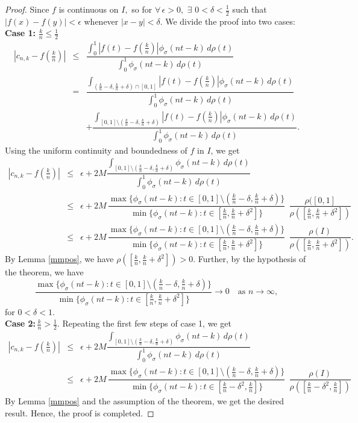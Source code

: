 \documentclass[12pt, reqno]{amsart}
\numberwithin{equation}{section}
\theoremstyle{definition}
\theoremstyle{remark}
\numberwithin{equation}{section}
\begin{document}
\begin{proof}
Since $f$ is continuous on $I,$ so for $\forall\,\epsilon>0,$ $\exists \,\, 0<\delta<\frac{1}{2}$ such that $|f(x)-f(y)|<\epsilon$ whenever $|x-y|<\delta$. We divide the proof into two cases: \\
\textbf{Case 1:} $\frac{k}{n}\leq\frac{1}{2}$
\begin{eqnarray*}
\left|c_{n,k}-f\left(\frac{k}n{}\right)\right|
&\leq&\dfrac{\displaystyle\int_{0}^{1}\left|f(t)-f\left(\frac{k}{n}\right)\right|\phi_\sigma(nt-k)\,d\rho(t)}{\int_{0}^1\phi_\sigma(nt-k)\,d\rho(t)}\\ 
&=& \dfrac{\displaystyle{\int_{(\frac{k}{n}-\delta, \frac{k}{n}+\delta)\cap [0,1]}}\left|f(t)-f\left(\frac{k}{n}\right)\right|\phi_\sigma(nt-k)\,d\rho(t)}{\int_{0}^1\phi_\sigma(nt-k)\,d\rho(t)} \\&&+\dfrac{\displaystyle{\int_{[0,1]\setminus(\frac{k}{n}-\delta, \frac{k}{n}+\delta)}}\left|f(t)-f\left(\frac{k}{n}\right)\right|\phi_\sigma(nt-k)\,d\rho(t)}{\int_{0}^1\phi_\sigma(nt-k)\,d\rho(t)}. 
\end{eqnarray*}
Using the uniform continuity and boundedness of $f$ in $I$, we get 
 \begin{eqnarray*}
\left|c_{n,k}-f\left(\frac{k}n{}\right)\right| &\leq& \epsilon + 2 M \dfrac{\displaystyle{\int_{[0,1]\setminus(\frac{k}{n}-\delta, \frac{k}{n}+\delta)}}\phi_\sigma(nt-k)\,d\rho(t)}{\int_{0}^1\phi_\sigma(nt-k)\,d\rho(t)} \\
 &\leq& \epsilon + 2M\,\dfrac{\max\{\phi_\sigma(nt-k): t\in [0,1]\setminus (\frac{k}{n}-\delta, \frac{k}{n}+\delta) \}}{\min\{\phi_\sigma(nt-k): t\in[\frac{k}{n}, \frac{k}{n}+\delta^2]\}} \ \ \dfrac{\rho([0,1]}{\rho([\frac{k}{n}, \frac{k}{n}+\delta^2])} \\
 &\leq& \epsilon+ 2M\,\dfrac{\max\{\phi_\sigma(nt-k): t\in [0,1] \setminus(\frac{k}{n}-\delta, \frac{k}{n}+\delta) \}}{\min\{\phi_\sigma(nt-k): t\in[\frac{k}{n}, \frac{k}{n}+\delta^2]\}} \ \ \dfrac{\rho(I)}{\rho([\frac{k}{n}, \frac{k}{n}+\delta^2])}. 
    \end{eqnarray*}
By Lemma \ref{mmpos}, we have $\rho([\frac{k}{n}, \frac{k}{n}+\delta^2])>0.$ Further, by the hypothesis of the theorem, we have 
\[\dfrac{\max\{\phi_\sigma(nt-k): t\in [0,1]\setminus(\frac{k}{n}-\delta, \frac{k}{n}+\delta) \}}{\min\{\phi_\sigma(nt-k): t\in[\frac{k}{n}, \frac{k}{n}+\delta^2]\}}\to 0\quad \text{as}\,\, n\to \infty,\]
for $0<\delta<1.$ \\
\textbf{Case 2:\,$\frac{k}{n}>\frac{1}{2}.$} 
Repeating the first few steps of case 1, we get
\begin{eqnarray*}
\left|c_{n,k}-f\left(\frac{k}n{}\right)\right| 
&\leq& \epsilon + 2 M \dfrac{\displaystyle{\int_{[0,1]\setminus(\frac{k}{n}-\delta, \frac{k}{n}+\delta)}}\phi_\sigma(nt-k)\,d\rho(t)}{\int_{0}^1\phi_\sigma(nt-k)\,d\rho(t)} \\
&\leq& \epsilon+ 2M\,\dfrac{\max\{\phi_\sigma(nt-k): t\in [0,1] \setminus(\frac{k}{n}-\delta, \frac{k}{n}+\delta) \}}{\min\{\phi_\sigma(nt-k): t\in[\frac{k}{n}-\delta^2, \frac{k}{n}]\}} \ \ \dfrac{\rho(I)}{\rho([\frac{k}{n}-\delta^2, \frac{k}{n}])}
\end{eqnarray*}
By Lemma \ref{mmpos} and the assumption of the theorem, we get the desired result. Hence, the proof is completed.
\end{proof}
\end{document}
